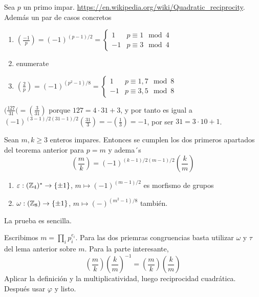\documentclass[CR.tex]{subfiles}
\begin{document}
\begin{teorema}
Sea $p$ un primo impar. \url{https://en.wikipedia.org/wiki/Quadratic_reciprocity}. Además un par de casos concretos

\begin{enumerate}
\item $(\frac{-1}{p})=(-1)^{(p-1)/2}=\begin{cases}
1 & p\equiv 1\mod 4\\
-1 & p\equiv 3\mod 4
\end{cases}$

\item {enumerate}
\item $(\frac{2}{p})=(-1)^{(p^2-1)/8}=\begin{cases}
1 & p\equiv 1,7\mod 8\\
-1 & p\equiv 3,5\mod 8
\end{cases}$
\end{enumerate}
\end{teorema}
\begin{dem}
\end{dem}

\begin{ej}
$(\frac{127}{31}(=(\frac{3}{31})$ porque $127=4\cdot 31+3$, y por tanto es igual a $(-1)^{(3-1)/2 (31-1)/2}(\frac{31}{3})=-(\frac{1}{3})=-1$, por ser $31=3\cdot 10+1$.
\end{ej}

\begin{teorema}
Sean $m,k\geq 3$ enteros impares. Entonces se cumplen los dos primeros apartados del teorema anterior para $p=m$ y adema´s
\[
(\frac{m}{k})=(-1)^{(k-1)/2 (m-1)/2}(\frac{k}{m})
\]
\end{teorema}

\begin{lemma}
\begin{enumerate}
\item $\varepsilon:(\mathbb{Z}_4)^*\to \{\pm 1\}$, $m\mapsto (-1)^{(m-1)/2}$ es morfismo de grupos
\item $\omega:(\mathbb{Z}_8)\to\{\pm 1\}$, $m\mapsto (-)^{(m^2-1)/8}$ también.
\end{enumerate}
\end{lemma}
La prueba es sencilla. 

\begin{dem}
Escribimos $m=\prod_i p_i^{e_i}$. Para las dos priemras congruencias basta utilizar $\omega$ y $\tau$ del lema anterior sobre $m$. Para la parte interesante, 
\[
(\frac{m}{k})(\frac{k}{m})^{-1}=(\frac{m}{k})(\frac{k}{m})
\]
Aplicar la definición y la multiplicatividad, luego reciprocidad cuadrática. Después usar $\varphi$ y listo. 
\end{dem}
\end{document}
